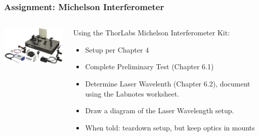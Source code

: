 \documentclass{beamer}
\begin{document}
\begin{frame}\frametitle{Assignment: Michelson Interferometer}
\begin{columns}
\begin{column}{5cm}
\begin{center}
\includegraphics[width=4.5cm]{fig/mint2.jpg}
\end{center}
\end{column}
\begin{column}{6cm}
Using the ThorLabs Michelson Interferometer Kit:
\begin{itemize}
\item Setup per Chapter 4
\item Complete Preliminary Test (Chapter 6.1)
\item Determine Laser Wavelenth (Chapter 6.2), document using the Labnotes worksheet.
\item Draw a diagram of the Laser Wavelength setup.
\item When told: teardown setup, but keep optics in mounts
\end{itemize}
\end{column}
\end{columns}
\end{frame}
\end{document}
